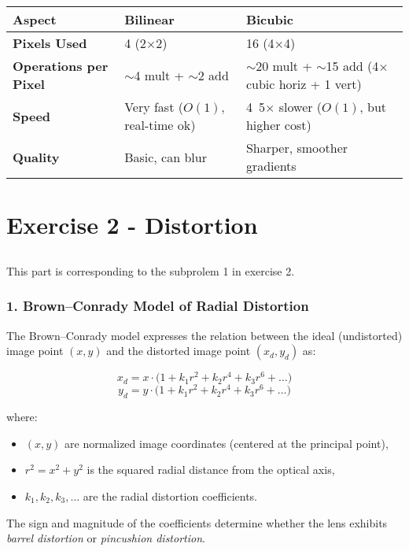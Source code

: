\documentclass[12pt]{article}
\begin{document}
\begin{tabular}{|p{2.5cm}|p{5cm}|p{5cm}|}
\hline
\textbf{Aspect} & \textbf{Bilinear} & \textbf{Bicubic} \\
\hline
\textbf{Pixels Used} & 4 (2$\times$2) & 16 (4$\times$4) \\
\hline
\textbf{Operations per Pixel} & $\sim$4 mult + $\sim$2 add & $\sim$20 mult + $\sim$15 add (4$\times$ cubic horiz + 1 vert) \\
\hline
\textbf{Speed} & Very fast ($O(1)$, real-time ok) & 4~5$\times$ slower ($O(1)$, but higher cost) \\
\hline
\textbf{Quality} & Basic, can blur & Sharper, smoother gradients \\
\hline
\end{tabular}

\newpage
\section{Exercise 2 - Distortion}
\subsection{}
This part is corresponding to the subprolem 1 in exercise 2.
\subsubsection*{1. Brown--Conrady Model of Radial Distortion}

The Brown--Conrady model expresses the relation between the ideal (undistorted) image point 
$(x, y)$ and the distorted image point $(x_d, y_d)$ as:

\[
x_d = x \cdot \big( 1 + k_1 r^2 + k_2 r^4 + k_3 r^6 + \dots \big)
\]
\[
y_d = y \cdot \big( 1 + k_1 r^2 + k_2 r^4 + k_3 r^6 + \dots \big)
\]

where:
\begin{itemize}
    \item $(x, y)$ are normalized image coordinates (centered at the principal point),
    \item $r^2 = x^2 + y^2$ is the squared radial distance from the optical axis,
    \item $k_1, k_2, k_3, \dots$ are the radial distortion coefficients.
\end{itemize}

The sign and magnitude of the coefficients determine whether the lens exhibits 
\emph{barrel distortion} or \emph{pincushion distortion}.
\end{document}
